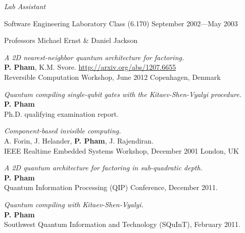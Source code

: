 \documentclass[letter]{article}
\begin{document}
\vspace{0.5\baselineskip}
\par
{\em Lab Assistant}
\par
Software Engineering Laboratory Class (6.170) \hfill September 2002---May 2003
\par
Professors Michael Ernst \& Daniel Jackson
\par

\pagebreak

\vspace{\baselineskip}
\par
\emph{A 2D nearest-neighbor quantum architecture for factoring.}
\\
\textbf{P. Pham}, K.M. Svore. \hfill \url{http://arxiv.org/abs/1207.6655}\\
Reversible Computation Workshop, June 2012 \hfill Copenhagen, Denmark

\vspace{\baselineskip}
\par
\emph{Quantum compiling single-qubit gates with the Kitaev-Shen-Vyalyi procedure.}\\
\textbf{P. Pham}\\
Ph.D. qualifying examination report.

\vspace{\baselineskip}
\par
\emph{Component-based invisible computing.}\\
A. Forin, J. Helander, \textbf{P. Pham}, J. Rajendiran.\\
IEEE Realtime Embedded Systems Workshop, December 2001 \hfill London, UK

\vspace{\baselineskip}
\par
\emph{A 2D quantum architecture for factoring in sub-quadratic depth.}
\\
\textbf{P. Pham}\\
Quantum Information Processing (QIP) Conference, December 2011.

\vspace{\baselineskip}
\par
\emph{Quantum compiling with Kitaev-Shen-Vyalyi.}\\
\textbf{P. Pham}\\
Southwest Quantum Information and Technology (SQuInT), February 2011.
\end{document}
